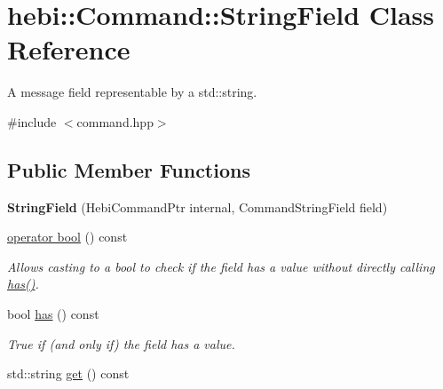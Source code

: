 \hypertarget{classhebi_1_1Command_1_1StringField}{}\section{hebi\+:\+:Command\+:\+:String\+Field Class Reference}
\label{classhebi_1_1Command_1_1StringField}


A message field representable by a std\+::string.  




{\ttfamily \#include $<$command.\+hpp$>$}

\subsection*{Public Member Functions}
\begin{DoxyCompactItemize}
\item 
\mbox{\label{classhebi_1_1Command_1_1StringField_ae7b2fffca27317a938a0915f1c184832}} 
{\bfseries String\+Field} (Hebi\+Command\+Ptr internal, Command\+String\+Field field)
\item 
\hyperlink{classhebi_1_1Command_1_1StringField_a6cb2fc39a5f13097c50dc89baf81aa61}{operator bool} () const
\begin{DoxyCompactList}\small\item\em Allows casting to a bool to check if the field has a value without directly calling {\ttfamily \hyperlink{classhebi_1_1Command_1_1StringField_ae05e05ab9e984b07f8ccc186b1d80833}{has()}}. \end{DoxyCompactList}\item 
\mbox{\label{classhebi_1_1Command_1_1StringField_ae05e05ab9e984b07f8ccc186b1d80833}} 
bool \hyperlink{classhebi_1_1Command_1_1StringField_ae05e05ab9e984b07f8ccc186b1d80833}{has} () const
\begin{DoxyCompactList}\small\item\em True if (and only if) the field has a value. \end{DoxyCompactList}\item 
\mbox{\label{classhebi_1_1Command_1_1StringField_a0255f5ad404f37b46915941f98c5c8cd}} 
std\+::string \hyperlink{classhebi_1_1Command_1_1StringField_a0255f5ad404f37b46915941f98c5c8cd}{get} () const

\end{DoxyCompactItemize}
